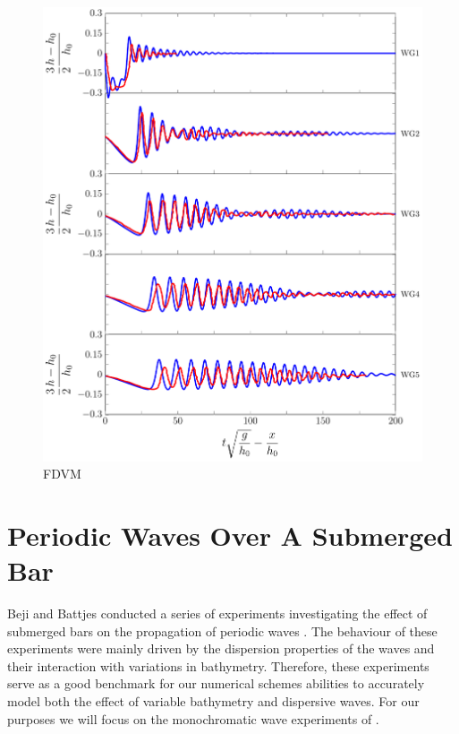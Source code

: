 \begin{figure}
	\centering
	\includegraphics[width=\textwidth]{./chp6/figures/Experiment/Segur/LongWGsFDVM3cm.pdf}
	\caption{FDVM}
	\label{fig:Segur3cmFDVM}
\end{figure}  


\section{Periodic Waves Over A Submerged Bar}
Beji and Battjes conducted a series of experiments investigating the effect of submerged bars on the propagation of periodic waves \cite{Beji-Battjes-1993-151,Beji-Battjes-1994-1}. The behaviour of these experiments were mainly driven by the dispersion properties of the waves and their interaction with variations in bathymetry. Therefore, these experiments serve as a good benchmark for our numerical schemes abilities to accurately model both the effect of variable bathymetry and dispersive waves. For our purposes we will focus on the monochromatic wave experiments of \citet{Beji-Battjes-1994-1}.

